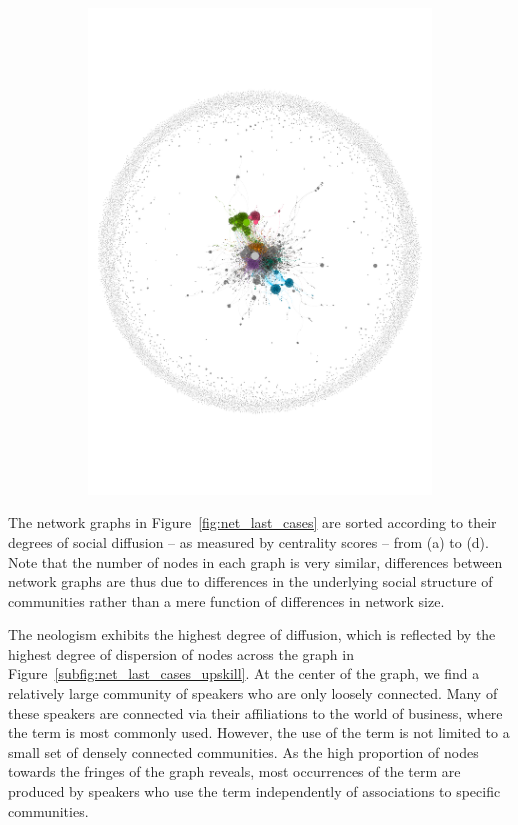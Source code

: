 \documentclass[
  a4paper,
  abstract=on,
  captions=tableabove
  ]{scrartcl}
\begin{document}
\begin{figure}
\begin{subfigure}{.45\linewidth}
          \includegraphics[width=\linewidth, height=\textheight, keepaspectratio]{img/net_solopreneur_four.pdf}
        \end{subfigure}
      \end{figure}

      The network graphs in Figure~\ref{fig:net_last_cases} are sorted according to their degrees of social diffusion -- as measured by centrality scores -- from (a) to (d). Note that the number of nodes in each graph is very similar, differences between network graphs are thus due to differences in the underlying social structure of communities rather than a mere function of differences in network size.

      The neologism  exhibits the highest degree of diffusion, which is reflected by the highest degree of dispersion of nodes across the graph in Figure~\ref{subfig:net_last_cases_upskill}. At the center of the graph, we find a relatively large community of speakers who are only loosely connected. Many of these speakers are connected via their affiliations to the world of business, where the term  is most commonly used. However, the use of the term is not limited to a small set of densely connected communities. As the high proportion of nodes towards the fringes of the graph reveals, most occurrences of the term are produced by speakers who use the term independently of associations to specific communities. 
\end{document}
